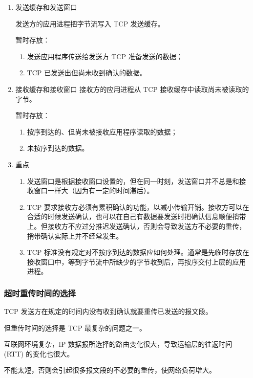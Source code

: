 \documentclass[11pt]{article}
\begin{document}
\begin{enumerate}
\item 发送缓存和发送窗口
\label{sec:orgd47193f}

发送方的应用进程把字节流写入 TCP 发送缓存。

暂时存放：
\begin{enumerate}
\item 发送应用程序传送给发送方 TCP 准备发送的数据；
\item TCP 已发送出但尚未收到确认的数据。
\end{enumerate}

\item 接收缓存和接收窗口
\label{sec:org9f04b58}
接收方的应用进程从 TCP 接收缓存中读取尚未被读取的字节。

暂时存放：
\begin{enumerate}
\item 按序到达的、但尚未被接收应用程序读取的数据；
\item 未按序到达的数据。
\end{enumerate}

\item 重点
\label{sec:orgfe658ae}
\begin{enumerate}
\item 发送窗口是根据接收窗口设置的，但在同一时刻，发送窗口并不总是和接收窗口一样大（因为有一定的时间滞后）。
\item TCP 要求接收方必须有累积确认的功能，以减小传输开销。接收方可以在合适的时候发送确认，也可以在自己有数据要发送时把确认信息顺便捎带上。但接收方不应过分推迟发送确认，否则会导致发送方不必要的重传，捎带确认实际上并不经常发生。
\item TCP 标准没有规定对不按序到达的数据应如何处理。通常是先临时存放在接收窗口中，等到字节流中所缺少的字节收到后，再按序交付上层的应用进程。
\end{enumerate}
\end{enumerate}

\subsubsection{超时重传时间的选择}
\label{sec:org128d432}
TCP 发送方在规定的时间内没有收到确认就要重传已发送的报文段。

但重传时间的选择是 TCP 最复杂的问题之一。

互联网环境复杂，IP 数据报所选择的路由变化很大，导致运输层的往返时间 (RTT) 的变化也很大。

不能太短，否则会引起很多报文段的不必要的重传，使网络负荷增大。
\end{document}
